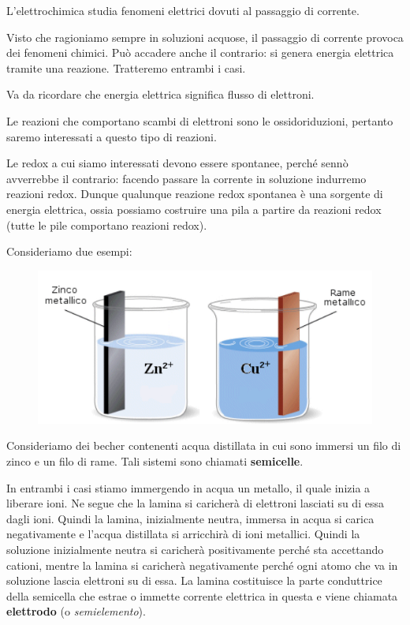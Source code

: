 L'elettrochimica studia fenomeni elettrici dovuti al passaggio di corrente.

Visto che ragioniamo sempre in soluzioni acquose, il passaggio di corrente provoca dei fenomeni chimici. Può accadere anche il contrario: si genera energia elettrica tramite una reazione. Tratteremo entrambi i casi.

\vspace{0.2cm}Va da ricordare che energia elettrica significa flusso di elettroni.

Le reazioni che comportano scambi di elettroni sono le ossidoriduzioni, pertanto saremo interessati a questo tipo di reazioni.

Le redox a cui siamo interessati devono essere spontanee, perché sennò avverrebbe il contrario: facendo passare la corrente in soluzione indurremo reazioni redox. Dunque qualunque reazione redox spontanea è una sorgente di energia elettrica, ossia possiamo costruire una pila a partire da reazioni redox (tutte le pile comportano reazioni redox).

Consideriamo due esempi:

\begin{figure}[H]
    \centering
    \includegraphics[width=12cm]{immagini/piastre_metalliche.png}
\end{figure}

Consideriamo dei becher contenenti acqua distillata in cui sono immersi un filo di zinco e un filo di rame. Tali sistemi sono chiamati \textbf{semicelle}.

In entrambi i casi stiamo immergendo in acqua un metallo, il quale inizia a liberare ioni. Ne segue che la lamina si caricherà di elettroni lasciati su di essa dagli ioni. Quindi la lamina, inizialmente neutra, immersa in acqua si carica negativamente e l'acqua distillata si arricchirà di ioni metallici. Quindi la soluzione inizialmente neutra si caricherà positivamente perché sta accettando cationi, mentre la lamina si caricherà negativamente perché ogni atomo che va in soluzione lascia elettroni su di essa. La lamina costituisce la parte conduttrice della semicella che estrae o immette corrente elettrica in questa e viene chiamata \textbf{elettrodo} (o \textit{semielemento}).

